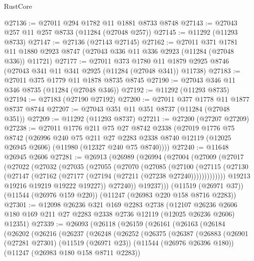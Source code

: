 \begin{lexlean}{RustCore}
\begin{coremodule}
@27136 := @27011 @294 @1782 @11 @1881 @8733 @8748
@27143 := @27043 @257 @11 @257 @8733 (@11284 (@27048 @257))
@27145 := @11292 (@11293 @8733)
@27147 := @27136 (@27143 @27145)
@27162 := @27011
    @371
    @1781
    @11
    @1880
    @2923
    @8747
    (@27043 @336 @11 @336 @2923 (@11284 (@27048 @336)) @11721)
@27177 := @27011
    @373
    @1780
    @11
    @1879
    @2925
    @8746
    (@27043 @341 @11 @341 @2925 (@11284 (@27048 @341)) @11738)
@27183 := @27011 @375 @1779 @11 @1878 @8735 @8745
@27190 := @27043 @346 @11 @346 @8735 (@11284 (@27048 @346))
@27192 := @11292 (@11293 @8735)
@27194 := @27183 (@27190 @27192)
@27200 := @27011 @377 @1778 @11 @1877 @8737 @8744
@27207 := @27043 @351 @11 @351 @8737 (@11284 (@27048 @351))
@27209 := @11292 (@11293 @8737)
@27211 := @27200 (@27207 @27209)
@27238 := @27011
    @1776
    @211
    @75
    @27
    @8742
    @2338
    (@27019
      @1776
      @75
      @8742
      (@26996
        @240
        @75
        @211
        @27
        @2283
        @2338
        @8740
        @12119
        (@12025 @26945 @2606)
        (@11980 (@12327 @240 @75 @8740))))
@27240 := @11648 @26945 @2606
@27281 := @26913
    (@26989
      (@26994
        (@27004
          (@27009
            (@27017
              (@27022
                (@27032
                  (@27035
                    (@27055
                      (@27070
                        (@27085
                          (@27100
                            (@27115
                              (@27130
                                (@27147 (@27162 (@27177 (@27194 (@27211 (@27238 @27240)))))))))))))
                  @19213
                  @19216
                  @19219
                  @19222
                  @19227))
              @27240))
          @19237)))
    (@11519 (@26971 @37))
    (@11544 (@26976 @159 @220))
    (@11247 (@26983 @220 @158 @8716 @2283))
@27301 := @12098
    @26236
    @321
    @169
    @2283
    @2738
    (@12107 @26236 @2606 @180 @169 @211 @27 @2283 @2338 @2736 @12119 (@12025 @26236 @2606) @12351)
@27339 := @26093
    (@26118
      (@26159
        (@26161
          (@26163
            (@26184
              (@26202
                (@26216
                  (@26237
                    (@26248
                      (@26252
                        (@26375
                          (@26387
                            (@26883
                              (@26901
                                (@27281 @27301)
                                (@11519 (@26971 @23))
                                (@11544 (@26976 @26396 @180))
                                (@11247 (@26983 @180 @158 @8711 @2283))

\end{coremodule}
\end{lexlean}
